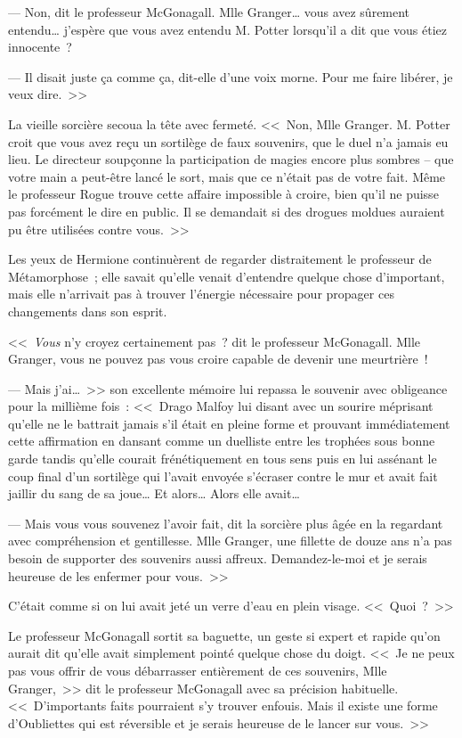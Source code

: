 --- Non, dit le professeur McGonagall. Mlle Granger… vous avez sûrement entendu… j'espère que vous avez entendu M. Potter lorsqu'il a dit que vous étiez innocente~?

--- Il disait juste ça comme ça, dit-elle d'une voix morne. Pour me faire libérer, je veux dire.~>>

La vieille sorcière secoua la tête avec fermeté. <<~Non, Mlle Granger. M. Potter croit que vous avez reçu un sortilège de faux souvenirs, que le duel n'a jamais eu lieu. Le directeur soupçonne la participation de magies encore plus sombres -- que votre main a peut-être lancé le sort, mais que ce n'était pas de votre fait. Même le professeur Rogue trouve cette affaire impossible à croire, bien qu'il ne puisse pas forcément le dire en public. Il se demandait si des drogues moldues auraient pu être utilisées contre vous.~>>

Les yeux de Hermione continuèrent de regarder distraitement le professeur de Métamorphose~; elle savait qu'elle venait d'entendre quelque chose d'important, mais elle n'arrivait pas à trouver l'énergie nécessaire pour propager ces changements dans son esprit.

<<~\emph{Vous} n'y croyez certainement pas~? dit le professeur McGonagall. Mlle Granger, vous ne pouvez pas vous croire capable de devenir une meurtrière~!

--- Mais j'ai…~>> son excellente mémoire lui repassa le souvenir avec obligeance pour la millième fois~: <<~Drago Malfoy lui disant avec un sourire méprisant qu'elle ne le battrait jamais s'il était en pleine forme et prouvant immédiatement cette affirmation en dansant comme un duelliste entre les trophées sous bonne garde tandis qu'elle courait frénétiquement en tous sens puis en lui assénant le coup final d'un sortilège qui l'avait envoyée s'écraser contre le mur et avait fait jaillir du sang de sa joue… Et alors… Alors elle avait…

--- Mais vous vous souvenez l'avoir fait, dit la sorcière plus âgée en la regardant avec compréhension et gentillesse. Mlle Granger, une fillette de douze ans n'a pas besoin de supporter des souvenirs aussi affreux. Demandez-le-moi et je serais heureuse de les enfermer pour vous.~>>

C'était comme si on lui avait jeté un verre d'eau en plein visage. <<~Quoi~?~>>

Le professeur McGonagall sortit sa baguette, un geste si expert et rapide qu'on aurait dit qu'elle avait simplement pointé quelque chose du doigt. <<~Je ne peux pas vous offrir de vous débarrasser entièrement de ces souvenirs, Mlle Granger,~>> dit le professeur McGonagall avec sa précision habituelle. <<~D'importants faits pourraient s'y trouver enfouis. Mais il existe une forme d'Oubliettes qui est réversible et je serais heureuse de le lancer sur vous.~>>

